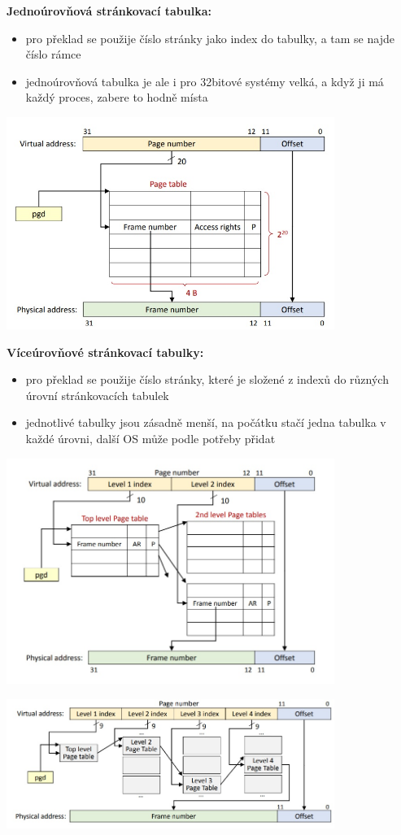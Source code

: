 \textbf{Jednoúrovňová stránkovací tabulka:}
\begin{itemize}
	\item pro překlad se použije číslo stránky jako index do tabulky, a tam se najde číslo rámce
	\item jednoúrovňová tabulka je ale i pro 32bitové systémy velká, a když ji má každý proces, zabere to hodně místa
\end{itemize}

\includegraphics[width=0.8\textwidth]{img/OB-6_0.jpg}

\newpage
\textbf{Víceúrovňové stránkovací tabulky:}
\begin{itemize}
	\item pro překlad se použije číslo stránky, které je složené z indexů do různých úrovní stránkovacích tabulek
	\item jednotlivé tabulky jsou zásadně menší, na počátku stačí jedna tabulka v každé úrovni, další OS může podle potřeby přidat
\end{itemize}

\includegraphics[width=0.8\textwidth]{img/OB-6_1.jpg}

\includegraphics[width=0.8\textwidth]{img/OB-6_2.jpg}

